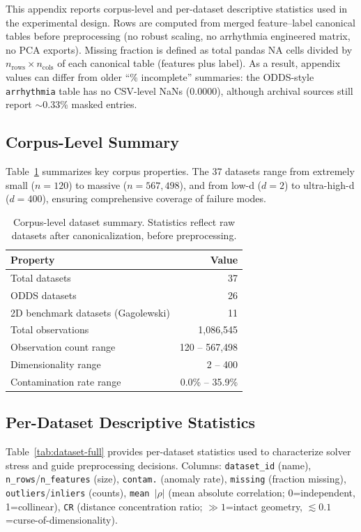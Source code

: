 \documentclass[cameraready]{Interspeech}
\begin{document}
This appendix reports corpus-level and per-dataset descriptive statistics used in the experimental design. Rows are computed from merged feature--label canonical tables before preprocessing (no robust scaling, no arrhythmia engineered matrix, no PCA exports). Missing fraction is defined as total pandas NA cells divided by \(n_{\text{rows}} \times n_{\text{cols}}\) of each canonical table (features plus label). As a result, appendix values can differ from older ``\% incomplete'' summaries: the ODDS-style \texttt{arrhythmia} table has no CSV-level NaNs (\(0.0000\)), although archival sources still report \(\sim\)0.33\% masked entries.

\subsection{Corpus-Level Summary}

Table~\ref{tab:dataset-summary} summarizes key corpus properties. The 37 datasets range from extremely small ($n=120$) to massive ($n=567{,}498$), and from low-d ($d=2$) to ultra-high-d ($d=400$), ensuring comprehensive coverage of failure modes.

\begin{table}[!ht]
\centering
\small
\caption{Corpus-level dataset summary. Statistics reflect raw datasets after canonicalization, before preprocessing.}
\label{tab:dataset-summary}
\begin{tabular}{lr}
\toprule
\textbf{Property} & \textbf{Value} \\
\midrule
Total datasets & 37 \\
ODDS datasets & 26 \\
2D benchmark datasets (Gagolewski) & 11 \\
Total observations & 1{,}086{,}545 \\
Observation count range & 120 -- 567{,}498 \\
Dimensionality range & 2 -- 400 \\
Contamination rate range & 0.0\% -- 35.9\% \\
\bottomrule
\end{tabular}
\end{table}

\subsection{Per-Dataset Descriptive Statistics}

Table~\ref{tab:dataset-full} provides per-dataset statistics used to characterize solver stress and guide preprocessing decisions. Columns: \texttt{dataset\_id} (name), \texttt{n\_rows}/\texttt{n\_features} (size), \texttt{contam.} (anomaly rate), \texttt{missing} (fraction missing), \texttt{outliers}/\texttt{inliers} (counts), \texttt{mean $|\rho|$} (mean absolute correlation; 0=independent, 1=collinear), \texttt{CR} (distance concentration ratio; $\gg1$=intact geometry, $\lesssim0.1$=curse-of-dimensionality).
\end{document}
